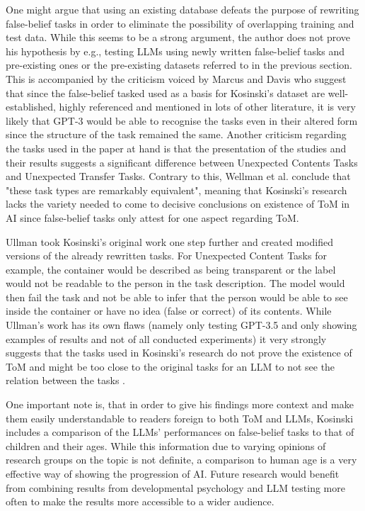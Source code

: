 One might argue that using an existing database defeats the purpose of rewriting false-belief tasks in order to eliminate the possibility of overlapping training and test data. While this seems to be a strong argument, the author does not prove his hypothesis by e.g., testing LLMs using newly written false-belief tasks and pre-existing ones or the pre-existing datasets referred to in the previous section. This is accompanied by the criticism voiced by Marcus and Davis \cite{critics2} who suggest that since the false-belief tasked used as a basis for Kosinski's dataset are well-established, highly referenced and mentioned in lots of other literature, it is very likely that GPT-3 would be able to recognise the tasks even in their altered form since the structure of the task remained the same. Another criticism regarding the tasks used in the paper at hand is that the presentation of the studies and their results suggests a significant difference between Unexpected Contents Tasks and Unexpected Transfer Tasks. Contrary to this, Wellman et al. conclude that "these task types are remarkably equivalent"\cite{tom_children_2001}, meaning that Kosinski's research lacks the variety needed to come to decisive conclusions on existence of ToM in AI since false-belief tasks only attest for one aspect regarding ToM.

Ullman took Kosinski's original work one step further and created modified versions of the already rewritten tasks. For Unexpected Content Tasks for example, the container would be described as being transparent or the label would not be readable to the person in the task description. The model would then fail the task and not be able to infer that the person would be able to see inside the container or have no idea (false or correct) of its contents. While Ullman's work has its own flaws (namely only testing GPT-3.5 and only showing examples of results and not of all conducted experiments) it very strongly suggests that the tasks used in Kosinski's research do not prove the existence of ToM and might be too close to the original tasks for an LLM to not see the relation between the tasks \cite{critics3}.

One important note is, that in order to give his findings more context and make them easily understandable to readers foreign to both ToM and LLMs, Kosinski includes a comparison of the LLMs' performances on false-belief tasks to that of children and their ages. While this information due to varying opinions of research groups on the topic is not definite, a comparison to human age is a very effective way of showing the progression of AI. Future research would benefit from combining results from developmental psychology and LLM testing more often to make the results more accessible to a wider audience.


